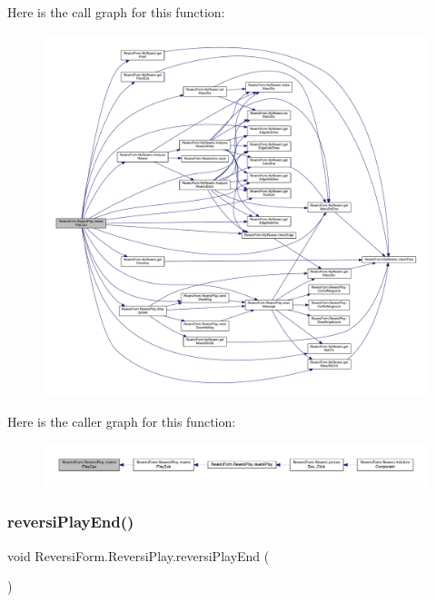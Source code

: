 Here is the call graph for this function\+:\nopagebreak
\begin{figure}[H]
\begin{center}
\leavevmode
\includegraphics[width=350pt]{class_reversi_form_1_1_reversi_play_abec0ea86adfc0d2f960af71235eea016_cgraph}
\end{center}
\end{figure}
Here is the caller graph for this function\+:\nopagebreak
\begin{figure}[H]
\begin{center}
\leavevmode
\includegraphics[width=350pt]{class_reversi_form_1_1_reversi_play_abec0ea86adfc0d2f960af71235eea016_icgraph}
\end{center}
\end{figure}
\mbox{\label{class_reversi_form_1_1_reversi_play_abb6d68c910c7d14ff4eaa8db745f0449}} 
\subsubsection{\texorpdfstring{reversi\+Play\+End()}{reversiPlayEnd()}}
{\footnotesize\ttfamily void Reversi\+Form.\+Reversi\+Play.\+reversi\+Play\+End (\begin{DoxyParamCaption}{ }\end{DoxyParamCaption})}



